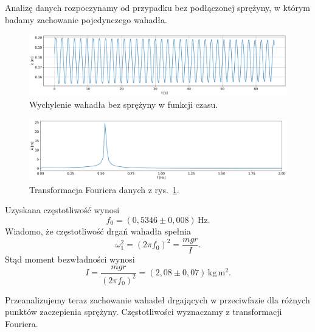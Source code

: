 \documentclass[12pt]{article}
\begin{document}
Analizę danych rozpoczynamy od przypadku bez podłączonej sprężyny, w którym badamy zachowanie pojedynczego wahadła.
\begin{figure}[H]
	\centering
	\includegraphics[width=\linewidth]{no_spring}
	\caption{Wychylenie wahadła bez sprężyny w funkcji czasu.}
	\label{fig:pendulum_nospring}
\end{figure}
\begin{figure}[H]
	\centering
	\includegraphics[width=\linewidth]{no_spring_fft}
	\caption{Transformacja Fouriera danych z rys.~\ref{fig:pendulum_nospring}.}
	\label{fig:pendulum_nospring_fft}
\end{figure}
Uzyskana częstotliwość wynosi
\[
	f_0 = (0{,}5346 \pm 0{,}008)\,\mathrm{Hz}.
\]
Wiadomo, że częstotliwość drgań wahadła spełnia\cite{skrypt}
\[
	\omega_1^2 = (2\pi f_0)^2 = \frac{mgr}{I}.
\]
Stąd moment bezwładności wynosi
\[
	I = \frac{mgr}{(2\pi f_0)^2} = (2{,}08 \pm 0{,}07)\,\mathrm{kg\,m^2}.
\]

Przeanalizujemy teraz zachowanie wahadeł drgających w przeciwfazie dla różnych punktów zaczepienia sprężyny. Częstotliwości wyznaczamy z transformacji Fouriera.

\newpage
\end{document}

